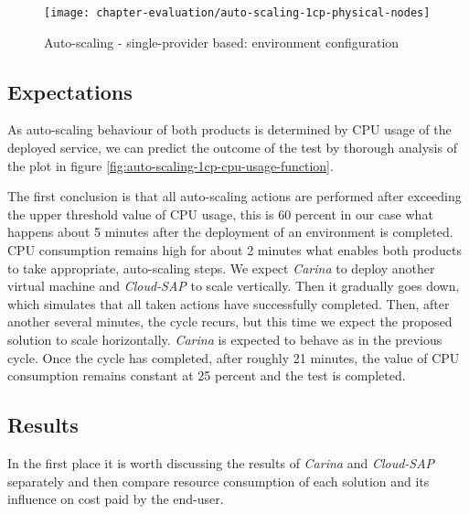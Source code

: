 \begin{figure}[!ht]
  \begin{center}
    \texttt{[image: chapter-evaluation/auto-scaling-1cp-physical-nodes]}
  \end{center}
  \caption{Auto-scaling - single-provider based: environment configuration}
  \label{fig:auto-scaling-1cp-physical-nodes}
\end{figure}


\subsection*{Expectations}
As auto-scaling behaviour of both products is determined by CPU usage of the deployed service, we can predict the outcome of the test by thorough analysis of the plot in figure \ref{fig:auto-scaling-1cp-cpu-usage-function}.

The first conclusion is that all auto-scaling actions are performed after exceeding the upper threshold value of CPU usage, this is 60 percent in our case what happens about 5 minutes after the deployment of an environment is completed. CPU consumption remains high for about 2 minutes what enables both products to take appropriate, auto-scaling steps. We expect \emph{Carina} to deploy another virtual machine and \emph{Cloud-SAP} to scale vertically. Then it gradually goes down, which simulates that all taken actions have successfully completed. Then, after another several minutes, the cycle recurs, but this time we expect the proposed solution to scale horizontally. \emph{Carina} is expected to behave as in the previous cycle. Once the cycle has completed, after roughly 21 minutes, the value of CPU consumption remains constant at 25 percent and the test is completed.
\subsection*{Results}
  In the first place it is worth discussing the results of \emph{Carina} and \emph{Cloud-SAP} separately and then compare resource consumption of each solution and its influence on cost paid by the end-user.

